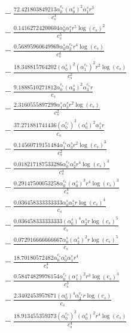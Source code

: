 \documentclass[10pt]{article}
\begin{document}
\begin{align*}
&{}  - \frac{72.421803849213 \alpha_{0}^{c_s} \left(\alpha_{0}^s\right)^{2} \alpha_{1}^s r^{3}}{c_{s}^{3}} \\
&{}  - \frac{0.14162724200604 \alpha_{0}^s \alpha_{1}^s r^{5} \log{\left(c_{s} \right)}^{2}}{c_{s}^{5}} \\
&{}  - \frac{0.56895960649969 \alpha_{0}^s \alpha_{2}^{c_s} r^{4} \log{\left(c_{s} \right)}}{c_{s}^{4}} \\
&{}  - \frac{18.348815764202 \left(\alpha_{0}^s\right)^{2} \left(\alpha_{1}^{c_s}\right)^{2} r^{2} \log{\left(c_{s} \right)}}{c_{s}^{2}} \\
&{}  - \frac{9.1888510271812 \alpha_{0}^{c_s} \left(\alpha_{0}^s\right)^{2} \alpha_{3}^{c_s} r}{c_{s}} \\
&{}  - \frac{2.3160555897299 \alpha_{1}^s \alpha_{3}^s r^{2} \log{\left(c_{s} \right)}}{c_{s}^{2}} \\
&{}  - \frac{37.271881741436 \left(\alpha_{0}^{c_s}\right)^{3} \left(\alpha_{0}^s\right)^{2} \alpha_{1}^s r}{c_{s}} \\
&{}  - \frac{0.14560719151484 \alpha_{1}^{c_s} \alpha_{3}^s r^{2} \log{\left(c_{s} \right)}^{3}}{c_{s}^{2}} \\
&{}  - \frac{0.018217187533286 \alpha_{0}^{c_s} \alpha_{2}^s r^{4} \log{\left(c_{s} \right)}^{3}}{c_{s}^{4}} \\
&{}  - \frac{0.29147500053258 \alpha_{0}^{c_s} \left(\alpha_{0}^s\right)^{3} r^{4} \log{\left(c_{s} \right)}^{3}}{c_{s}^{4}} \\
&{}  - \frac{0.036458333333333 \alpha_{0}^s \alpha_{5}^s r \log{\left(c_{s} \right)}^{4}}{c_{s}} \\
&{}  - \frac{0.036458333333333 \left(\alpha_{0}^s\right)^{4} \alpha_{2}^s r \log{\left(c_{s} \right)}^{5}}{c_{s}} \\
&{}  - \frac{0.072916666666667 \alpha_{0}^s \left(\alpha_{2}^s\right)^{2} r \log{\left(c_{s} \right)}^{5}}{c_{s}} \\
&{}  - \frac{18.70180572482 \alpha_{0}^{c_s} \alpha_{0}^s \alpha_{1}^s r^{4}}{c_{s}^{4}} \\
&{}  - \frac{0.58474829976154 \alpha_{0}^{c_s} \left(\alpha_{1}^s\right)^{2} r^{3} \log{\left(c_{s} \right)}^{3}}{c_{s}^{3}} \\
&{}  - \frac{2.3402453957671 \left(\alpha_{0}^s\right)^{4} \alpha_{2}^{c_s} r \log{\left(c_{s} \right)}}{c_{s}} \\
&{}  - \frac{18.913455359373 \left(\alpha_{0}^{c_s}\right)^{2} \left(\alpha_{0}^s\right)^{2} r^{4} \log{\left(c_{s} \right)}}{c_{s}^{4}} \\

\end{align*}
\end{document}
